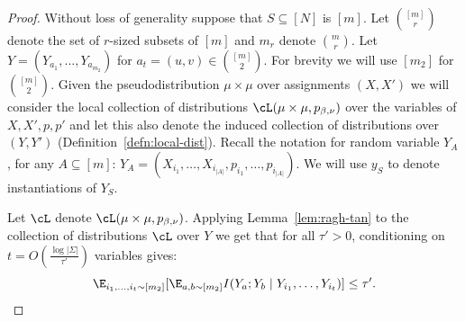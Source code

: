\begin{proof}
Without loss of generality suppose that $S \subseteq [N]$ is $[m]$. Let ${[m] \choose r}$ denote the set of $r$-sized subsets of $[m]$ and $m_r$ denote ${m \choose r}$. Let $Y = (Y_{a_1},\ldots,Y_{a_{m_2}})$ for $a_t = (u,v) \in {[m] \choose 2}$. For brevity we will use $[m_2]$ for ${[m] \choose 2}$. Given the pseudodistribution $\mu \times \mu$ over assignments $(X,X')$ we will consider the 
local collection of distributions $\cL(\mu \times \mu,p_{\beta,\nu})$ over the variables of $X,X',p,p'$ and let this also denote the induced collection of distributions over $(Y,Y')$ (Definition~\ref{defn:local-dist}). Recall the notation for random variable $Y_A$, for any $A \subseteq [m]$: $Y_A = (X_{i_1}, \ldots, X_{i_{|A|}}, p_{i_1}, \ldots, p_{i_{|A|}})$. We will use $y_S$ to denote instantiations of $Y_S$.

Let $\cL$ denote $\cL(\mu \times \mu,p_{\beta,\nu})$.
Applying Lemma~\ref{lem:ragh-tan} to the collection of  distributions $\cL$ over $Y$ we get that for all $\tau' > 0$, conditioning on $t = O(\frac{\log |\Sigma|}{\tau'})$ variables gives:
\begin{equation}\label{eq:rt-1}
\E_{i_1,\ldots,i_t \sim [m_2]}[\E_{a,b \sim [m_2]} I(Y_a ; Y_b \mid Y_{i_1}, \ldots,Y_{i_t})] \leq \tau'.
\end{equation}


\end{proof}
